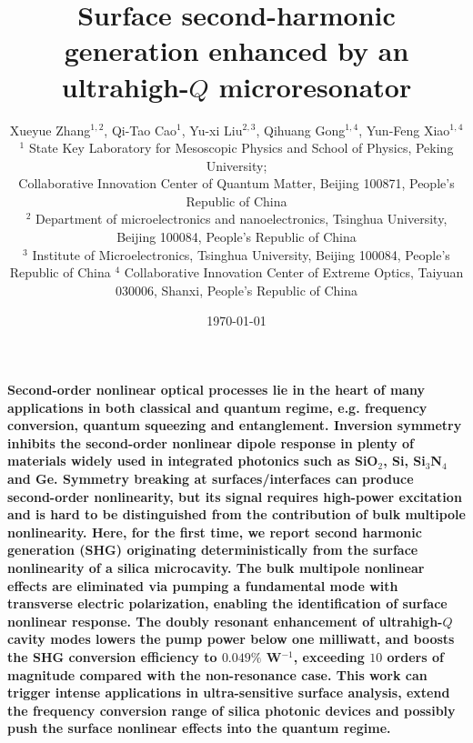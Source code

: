 \documentclass[a4paper,8pt,hyperref, twocolumn]{article}
\title{\bfseries \Large 
Surface second-harmonic generation enhanced by an ultrahigh-$Q$ microresonator
}
\author{\normalsize  Xueyue Zhang$^{1,2}$, Qi-Tao Cao$^{1}$, Yu-xi Liu$^{2,3}$, Qihuang Gong$^{1,4}$, Yun-Feng Xiao$^{1,4}$ \\
\normalsize $^1$ State Key Laboratory for Mesoscopic Physics and School of Physics, Peking University; \\
\normalsize Collaborative Innovation Center of Quantum Matter, Beijing 100871, People’s Republic of China \\
\normalsize $^2$ Department of microelectronics and nanoelectronics, Tsinghua University, Beijing 100084, People’s Republic of China \\
\normalsize $^3$ Institute of Microelectronics, Tsinghua University, Beijing 100084, People’s Republic of China
\normalsize $^4$ Collaborative Innovation Center of Extreme Optics, Taiyuan 030006, Shanxi, People’s Republic of China
}
\date{\normalsize \today}
\begin{document}
\maketitle




\textbf{
Second-order nonlinear optical processes lie in the heart of many applications in both classical and quantum regime, e.g. frequency conversion,  quantum squeezing and entanglement. 
Inversion symmetry inhibits the second-order nonlinear dipole response in plenty of materials widely used in integrated photonics such as SiO$_2$, Si, Si$_3$N$_4$ and Ge.
Symmetry breaking %
at surfaces/interfaces can produce second-order nonlinearity, but its signal requires high-power excitation and is hard to be distinguished from the contribution of bulk multipole nonlinearity.  %
Here, for the first time, we report second harmonic generation (SHG) originating deterministically from the surface nonlinearity of a silica microcavity.
The bulk multipole nonlinear effects are eliminated via pumping a fundamental mode with transverse electric polarization, enabling the identification of surface nonlinear response.
The doubly resonant enhancement of ultrahigh-$Q$ cavity modes lowers the pump power below one milliwatt, and boosts the SHG conversion efficiency to $0.049\%$ W$^{-1}$, exceeding $10$ orders of magnitude compared with the non-resonance case. 
This work can trigger intense applications in ultra-sensitive surface analysis, extend the frequency conversion range of silica photonic devices and possibly push the surface nonlinear effects into the quantum regime.
}
\end{document}
